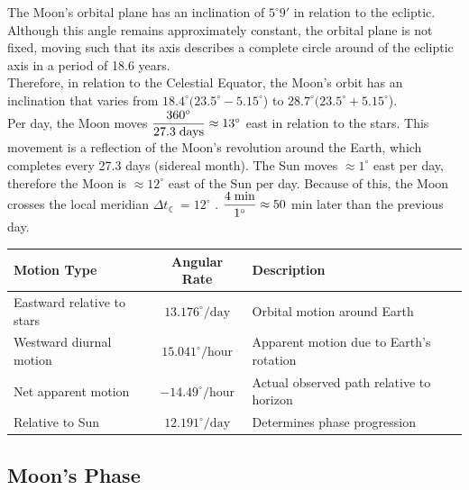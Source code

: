 \documentclass[a4paper,12pt]{extarticle}
\begin{document}
The Moon's orbital plane has an inclination of $5^\circ9'$ in relation to the ecliptic. Although this angle remains approximately constant, the orbital plane is not fixed, moving such that its axis describes a complete circle around of the ecliptic axis in a period of 18.6 years.\\

Therefore, in relation to the Celestial Equator, the Moon's orbit has an inclination that varies from $18.4^\circ(23.5^\circ - 5.15^\circ$) to $28.7^\circ(23.5^\circ + 5.15^\circ$).\\

Per day, the Moon moves $\dfrac{360^\circ}{27.3 \;\rm days} \approx 13^\circ$ east in relation to the stars. This movement is a reflection of the Moon's revolution around the Earth, which completes every 27.3 days (sidereal month). The Sun moves $\approx 1^\circ$ east per day, therefore the Moon is $\approx 12^\circ$ east of the Sun per day. Because of this, the Moon crosses the local meridian $\Delta t_{\leftmoon}= 12^\circ$ . $\dfrac{4 \;\rm min}{1^\circ} \approx 50$ min later than the previous day.

\begin{table}[H]
	\centering
	\begin{tabular}{|l|c|l|}
		\hline
		\textbf{Motion Type} & \textbf{Angular Rate} & \textbf{Description} \\ \hline
		Eastward relative to stars & $13.176^\circ/\text{day}$ & Orbital motion around Earth \\ \hline
		Westward diurnal motion & $15.041^\circ/\text{hour}$ & Apparent motion due to Earth's rotation \\ \hline
		Net apparent motion & $-14.49^\circ/\text{hour}$ & Actual observed path relative to horizon \\ \hline
		Relative to Sun & $12.191^\circ/\text{day}$ & Determines phase progression \\ \hline
	\end{tabular}
\end{table}

\subsection{Moon's Phase}
\end{document}
